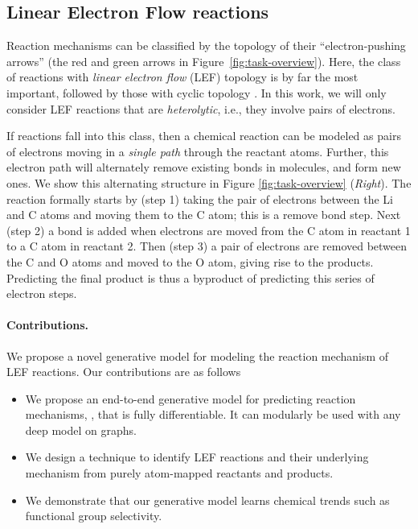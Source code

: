 \subsection{Linear Electron Flow reactions} 
%
Reaction mechanisms can be classified by the topology of their ``electron-pushing arrows'' (the red and green arrows in Figure~\ref{fig:task-overview}). Here, the class of reactions with \emph{linear electron flow} (LEF) topology is by far the most important, followed by those with cyclic topology \citep{herges1994coarctate}. In this work, we will only consider LEF reactions that are \emph{heterolytic}, i.e., they involve pairs of electrons.

If reactions fall into this class, then a chemical reaction can be modeled as pairs of electrons moving in a \emph{single path} through the reactant atoms. 
Further, this electron path will alternately remove existing bonds in molecules, and form new ones. We show this alternating structure in Figure \ref{fig:task-overview} (\emph{Right}). 
The reaction formally starts by (step 1) taking the pair of electrons between the Li and C atoms and moving them to the C atom; this is a remove bond step. 
Next (step 2) a bond is added when electrons are moved from the C atom in reactant 1 to a C atom in reactant 2.
Then (step 3) a pair of electrons are removed between the C and O atoms and moved to the O atom, giving rise to the products. 
Predicting the final product is thus a byproduct of predicting this series of electron steps.


\paragraph{Contributions.} We propose a novel generative model for modeling the reaction mechanism of LEF reactions. Our contributions are as follows
\begin{itemize}
\item We propose an end-to-end generative model for predicting reaction mechanisms, \ourModelR, that is fully differentiable. It can modularly be used with any deep model on graphs.
\item We design a technique to identify LEF reactions and their underlying mechanism from purely atom-mapped reactants and products.
\item We demonstrate that our generative model learns chemical trends such as functional group selectivity.
\end{itemize}


